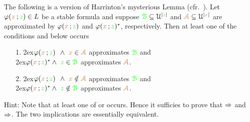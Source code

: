 \documentclass[creche.tex]{subfiles}
\begin{document}
\begin{exercise}\label{ex_harrington}
\def\grB{{\gr{\EuScript B}}}
\def\mrA{{\mr{\EuScript A}}}
The following is a version of Harrinton's mysterious 
Lemma (cfr.~\cite[Lemma 8.3.4]{TZ}).
Let $\varphi({\color{brown} x}\,;{\color{green} z})\in L$ be a stable formula and suppose $\grB\subseteq\U^{|{\gr z}|}$ and $\mrA\subseteq\U^{|{\mr x}|}$ are approximated by $\varphi({\color{brown} x}\,;{\color{green} z})$ and  $\varphi({\color{brown} x}\,;{\color{green} z})^*$, respectively.
Then at least one of the conditions  and  below occurs

\begin{itemize}
\item[1.]
\kern2ex$\phi({\mr x}\,;{\gr z})^{\phantom{*}}\wedge\ {\mr x}\in{\mrA}$ approximates $\grB$ and\\
\kern2ex$\phi({\mr x}\,;{\gr z})^*\wedge\ {\gr z}\in{\grB}$ approximates $\mrA$.


\item[2.]
\kern2ex$\phi({\mr x}\,;{\gr z})^{\phantom{*}}\wedge\ {\mr x}\notin{\mrA}$ approximates $\grB$ and\\
\kern2ex$\phi({\mr x}\,;{\gr z})^*\wedge\ {\gr z}\notin{\grB}$ approximates $\mrA$.

\end{itemize}
Hint: Note that at least one of  or  occurs.
Hence it sufficies to prove that $\Rightarrow$ and $\Rightarrow$. The two implications are essentially equivalent.
% 
% 
% 
% 
% 
% 
% 
% 
% 
% 
\end{exercise}
\end{document}
